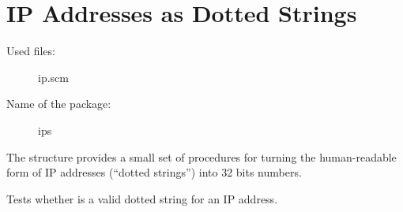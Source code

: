 \section{IP Addresses as Dotted Strings}
%
\begin{description}
\item[Used files:] ip.scm
\item[Name of the package:] ips
\end{description}
%

The structure  provides a small set of procedures for turning
the human-readable form of IP addresses (``dotted strings'') into 32
bits numbers.



\begin{desc}
  Tests whether  is a valid dotted string for an IP
  address.
\end{desc}
